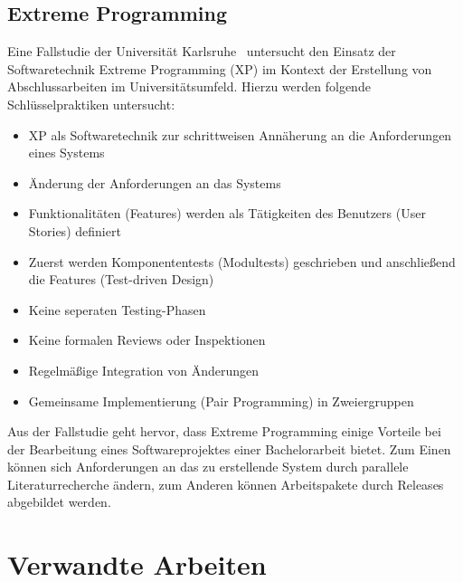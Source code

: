 \subsection*{Extreme Programming}
Eine Fallstudie der Universität Karlsruhe~\cite{muller_2001} untersucht den Einsatz der Softwaretechnik Extreme
Programming (XP) im Kontext der Erstellung von Abschlussarbeiten im Universitätsumfeld.
Hierzu werden folgende Schlüsselpraktiken untersucht:
\begin{itemize}
    \item XP als Softwaretechnik zur schrittweisen Annäherung an die Anforderungen eines Systems
    \item Änderung der Anforderungen an das Systems
    \item Funktionalitäten (Features) werden als Tätigkeiten des Benutzers (User Stories) definiert
    \item Zuerst werden Komponententests (Modultests) geschrieben und anschließend die Features (Test-driven Design)
    \item Keine seperaten Testing-Phasen
    \item Keine formalen Reviews oder Inspektionen
    \item Regelmäßige Integration von Änderungen
    \item Gemeinsame Implementierung (Pair Programming) in Zweiergruppen
\end{itemize}
Aus der Fallstudie geht hervor, dass Extreme Programming einige Vorteile bei der Bearbeitung eines Softwareprojektes
einer Bachelorarbeit bietet.
Zum Einen können sich Anforderungen an das zu erstellende System durch parallele Literaturrecherche ändern, zum
Anderen können Arbeitspakete durch Releases abgebildet werden.

\section{Verwandte Arbeiten}

